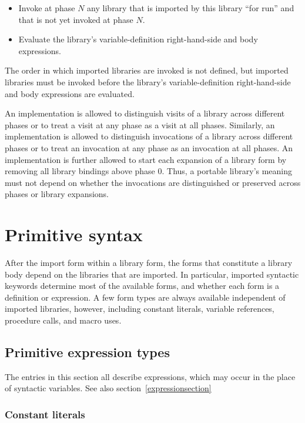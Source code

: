 \begin{itemize}
\item Invoke at phase $N$ any library that is imported by this library
      ``for {\cf run}'' and that is not yet invoked at phase $N$.
\item Evaluate the library's variable-definition right-hand-side and body
      expressions.
\end{itemize}

The order in which imported libraries are invoked is not defined, but
imported libraries must be invoked before the library's variable-definition
right-hand-side and body expressions are evaluated.

An implementation is allowed to distinguish visits of a library across
different phases or to treat a visit at any phase as a visit at all
phases.
Similarly, an implementation is allowed to distinguish invocations of a
library across different phases or to treat an invocation at any phase as
an invocation at all phases.
An implementation is further allowed to start each expansion of a
{\cf library} form by removing all library bindings above phase 0.
Thus, a portable library's meaning must not depend on whether the
invocations are distinguished or preserved across phases or {\cf library}
expansions.

\section{Primitive syntax}

After the {\cf import} form within a {\cf library} form, the forms
that constitute a library body depend on the libraries that are
imported. In particular, imported syntactic keywords determine most
of the available forms, and whether each form is a 
definition or expression. A few form types are
always available independent of imported libraries, however,
including constant literals, variable references, procedure calls,
 and macro uses.

\subsection{Primitive expression types}
\label{primitiveexpressionsection}

The entries in this section all describe expressions, which may occur
in the place of  syntactic variables.  See
also section~\ref{expressionsection}

\subsubsection*{Constant literals}\unsection

